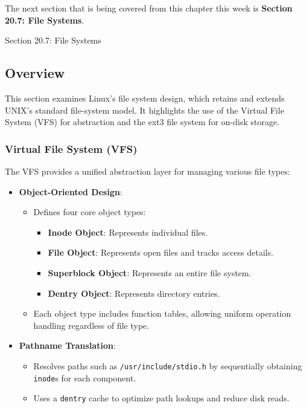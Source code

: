 The next section that is being covered from this chapter this week is \textbf{Section 20.7: File Systems}.

\begin{notes}{Section 20.7: File Systems}
    \subsection*{Overview}

    This section examines Linux's file system design, which retains and extends UNIX's standard file-system model. It highlights the use of the Virtual File System (VFS) for abstraction and the ext3 
    file system for on-disk storage.
    
    \subsubsection*{Virtual File System (VFS)}
    
    The VFS provides a unified abstraction layer for managing various file types:
    \begin{itemize}
        \item \textbf{Object-Oriented Design}:
        \begin{itemize}
            \item Defines four core object types:
            \begin{itemize}
                \item \textbf{Inode Object}: Represents individual files.
                \item \textbf{File Object}: Represents open files and tracks access details.
                \item \textbf{Superblock Object}: Represents an entire file system.
                \item \textbf{Dentry Object}: Represents directory entries.
            \end{itemize}
            \item Each object type includes function tables, allowing uniform operation handling regardless of file type.
        \end{itemize}
        \item \textbf{Pathname Translation}:
        \begin{itemize}
            \item Resolves paths such as \texttt{/usr/include/stdio.h} by sequentially obtaining \texttt{inode}s for each component.
            \item Uses a \texttt{dentry} cache to optimize path lookups and reduce disk reads.
        \end{itemize}
    \end{itemize}
    

\end{notes}
